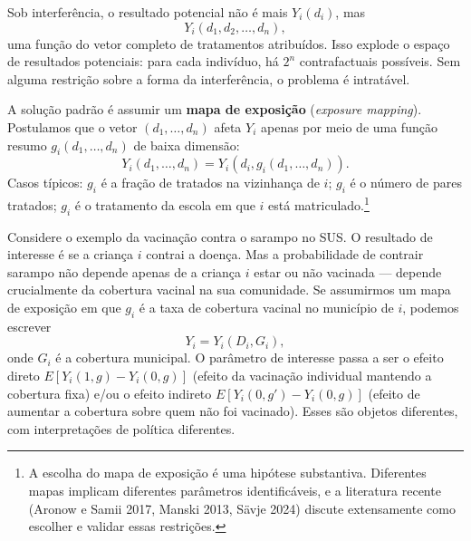 Sob interferência, o resultado potencial não é mais $Y_i(d_i)$, mas
\begin{equation}
Y_i(d_1, d_2, \dots, d_n),
\label{eq:resultado-vetor}
\end{equation}
uma função do vetor completo de tratamentos atribuídos. Isso explode o espaço de resultados potenciais: para cada indivíduo, há $2^n$ contrafactuais possíveis. Sem alguma restrição sobre a forma da interferência, o problema é intratável.

A solução padrão é assumir um \textbf{mapa de exposição} (\textit{exposure mapping}). Postulamos que o vetor $(d_1, \dots, d_n)$ afeta $Y_i$ apenas por meio de uma função resumo $g_i(d_1, \dots, d_n)$ de baixa dimensão:
\begin{equation}
Y_i(d_1, \dots, d_n) = Y_i(d_i, g_i(d_1, \dots, d_n)).
\label{eq:exposure-mapping}
\end{equation}
Casos típicos: $g_i$ é a fração de tratados na vizinhança de $i$; $g_i$ é o número de pares tratados; $g_i$ é o tratamento da escola em que $i$ está matriculado.\footnote{A escolha do mapa de exposição é uma hipótese substantiva. Diferentes mapas implicam diferentes parâmetros identificáveis, e a literatura recente (Aronow e Samii 2017, Manski 2013, Sävje 2024) discute extensamente como escolher e validar essas restrições.}

Considere o exemplo da vacinação contra o sarampo no SUS. O resultado de interesse é se a criança $i$ contrai a doença. Mas a probabilidade de contrair sarampo não depende apenas de a criança $i$ estar ou não vacinada --- depende crucialmente da cobertura vacinal na sua comunidade. Se assumirmos um mapa de exposição em que $g_i$ é a taxa de cobertura vacinal no município de $i$, podemos escrever
\begin{equation}
Y_i = Y_i(D_i, G_i),
\label{eq:vacinacao}
\end{equation}
onde $G_i$ é a cobertura municipal. O parâmetro de interesse passa a ser o efeito direto $E[Y_i(1, g) - Y_i(0, g)]$ (efeito da vacinação individual mantendo a cobertura fixa) e/ou o efeito indireto $E[Y_i(0, g') - Y_i(0, g)]$ (efeito de aumentar a cobertura sobre quem não foi vacinado). Esses são objetos diferentes, com interpretações de política diferentes.

